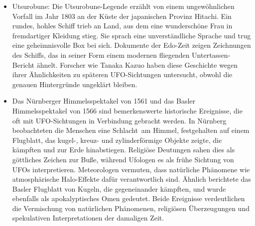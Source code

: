 \documentclass{scrartcl}
\begin{document}
\begin{itemize}
	\item Utsurobune: Die Utsurobune-Legende erzählt von einem ungewöhnlichen Vorfall im Jahr 1803 an der Küste der japanischen Provinz Hitachi. Ein rundes, hohles Schiff trieb an Land, aus dem eine wunderschöne Frau in fremdartiger Kleidung stieg. Sie sprach eine unverständliche Sprache und trug eine geheimnisvolle Box bei sich. Dokumente der Edo-Zeit zeigen Zeichnungen des Schiffs, das in seiner Form einem modernen \frq fliegenden Untertassen\flq-Bericht ähnelt. Forscher wie Tanaka Kazuo haben diese Geschichte wegen ihrer Ähnlichkeiten zu späteren UFO-Sichtungen untersucht, obwohl die genauen Hintergründe ungeklärt bleiben. 
	\item Das Nürnberger Himmelsspektakel von 1561 und das Basler Himmelsspektakel von 1566 sind bemerkenswerte historische Ereignisse, die oft mit UFO-Sichtungen in Verbindung gebracht werden. In Nürnberg beobachteten die Menschen eine \frq Schlacht\flq\ am Himmel, festgehalten auf einem Flugblatt, das kugel-, kreuz- und zylinderförmige Objekte zeigte, die kämpften und zur Erde hinabstiegen. Religiöse Deutungen sahen dies als göttliches Zeichen zur Buße, während Ufologen es als frühe Sichtung von UFOs interpretieren. Meteorologen vermuten, dass natürliche Phänomene wie atmosphärische Halo-Effekte dafür verantwortlich sind. Ähnlich berichtete das Basler Flugblatt von Kugeln, die gegeneinander \frq kämpften\flq, und wurde ebenfalls als apokalyptisches Omen gedeutet. Beide Ereignisse verdeutlichen die Vermischung von natürlichen Phänomenen, religiösen Überzeugungen und spekulativen Interpretationen der damaligen Zeit.



\end{itemize}
\end{document}
